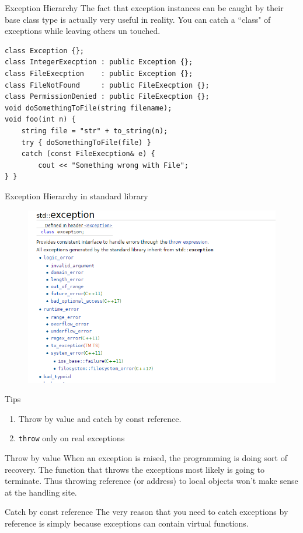 \begin{frame}[fragile]{Exception Hierarchy}
The fact that exception instances can be caught by their base class type is actually very useful in reality. You can catch a ``class" of exceptions while leaving others un touched.
\begin{verbatim}
class Exception {};
class IntegerExecption : public Exception {};
class FileExecption    : public Exception {};
class FileNotFound     : public FileExecption {};
class PermissionDenied : public FileExecption {};
void doSomethingToFile(string filename);
void foo(int n) {
    string file = "str" + to_string(n);
    try { doSomethingToFile(file) }
    catch (const FileExecption& e) {
    	cout << "Something wrong with File"; 
} }
\end{verbatim}
\end{frame}

\begin{frame}{Exception Hierarchy in standard library}
\vspace{-0.2in}
\begin{figure}
	\centering
	\includegraphics[scale=0.55]{fig/rc6stdexp}
\end{figure}
\end{frame}

\begin{frame}{Tips}
\begin{enumerate}
	\item Throw by value and catch by const reference.
	\item \texttt{throw} only on real exceptions
\end{enumerate}
\begin{block}{Throw by value}
	When an exception is raised, the programming is doing sort of recovery. The function that throws the exceptions most likely is going to terminate.
	Thus throwing reference (or address) to local objects won't make sense at the handling site.  
\end{block}
\begin{block}{Catch by const reference}
	The very reason that you need to catch exceptions by reference is simply because exceptions can contain virtual functions.
\end{block}
\end{frame}



